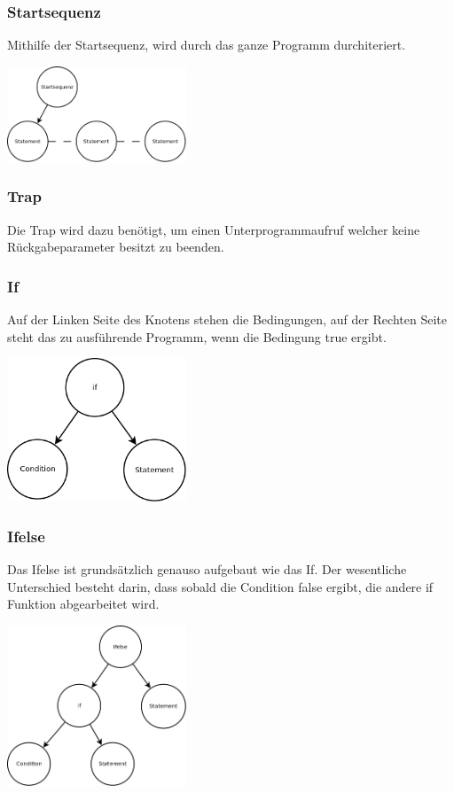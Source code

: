 \subsubsection{Startsequenz}
Mithilfe der Startsequenz, wird durch das ganze Programm durchiteriert.

\includegraphics[width=0.4\textwidth]{./media/images/interpreter/syntaxbaum/statements/startsequenz.png}

\subsubsection{Trap}
Die Trap wird dazu benötigt, um einen Unterprogrammaufruf welcher keine Rückgabeparameter besitzt zu beenden.

\subsubsection{If}
Auf der Linken Seite des Knotens stehen die Bedingungen, auf der Rechten Seite steht das zu ausführende Programm, wenn die Bedingung
true ergibt.

\includegraphics[width=0.4\textwidth]{./media/images/interpreter/syntaxbaum/statements/if.png}

\subsubsection{Ifelse}
Das Ifelse ist grundsätzlich genauso aufgebaut wie das If. Der wesentliche Unterschied besteht darin, dass sobald die Condition
false ergibt, die andere if Funktion abgearbeitet wird.

\includegraphics[width=0.4\textwidth]{./media/images/interpreter/syntaxbaum/statements/ifelse.png}

